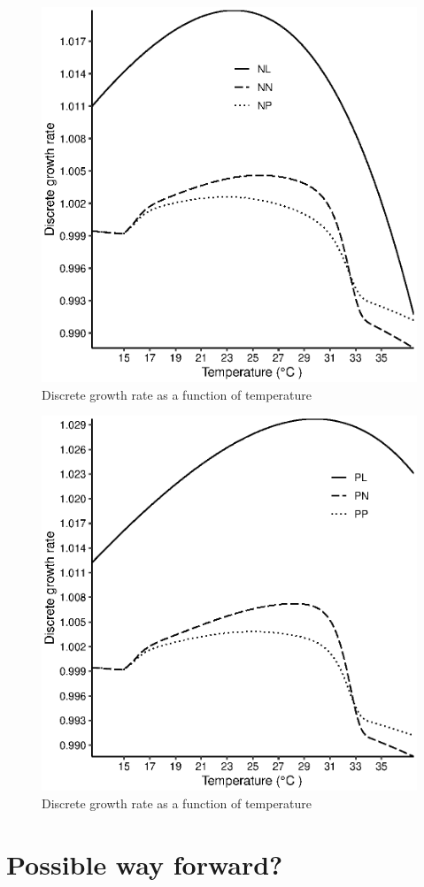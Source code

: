 \documentclass[10pt,a4paper]{article}
\begin{document}
\begin{figure}[hbt!]
	\centering
	\includegraphics[width=0.7\linewidth]{NLNP}
	\caption{Discrete growth rate as a function of temperature}
	\label{fig:tsetseflowchat3}
\end{figure}





\begin{figure}[hbt!]
	\centering
	\includegraphics[width=0.7\linewidth]{PLPP}
	\caption{Discrete growth rate as a function of temperature}
	\label{fig:tsetseflowchat3}
\end{figure}

\newpage 
\section*{Possible way forward?} 
\end{document}
